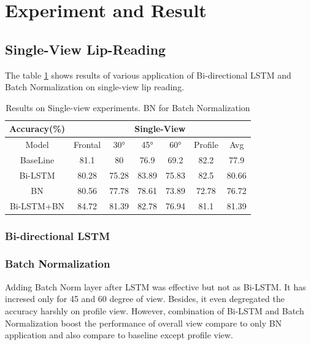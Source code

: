 
\section{Experiment and Result}

\subsection{Single-View Lip-Reading}
The table \ref{tab:singletb} shows results of various application of Bi-directional LSTM and Batch Normalization on single-view lip reading. 

\begin{table}[h]
\centering
    \begin{tabular}{c|cccccc}
        \multicolumn{1}{c|}{Accuracy(\%)} &%
        \multicolumn{6}{c}{Single-View}\\ \hline
        Model  &%
        Frontal & 30\si{\degree}& 45\si{\degree} & 60\si{\degree} & Profile & Avg\\\hline
        BaseLine%
        &%
        81.1& 80& 76.9& 69.2& 82.2&77.9\\
        Bi-LSTM%
        &%
        80.28& 75.28& 83.89& 75.83& 82.5&80.66\\
        BN%
        &%
        80.56& 77.78& 78.61& 73.89& 72.78&76.72\\
        Bi-LSTM+BN%
        &%
        84.72& 81.39& 82.78& 76.94& 81.1&81.39\\
    \end{tabular}
    \caption{Results on Single-view experiments. BN for Batch Normalization}
    \label{tab:singletb}
\end{table}

\subsubsection{Bi-directional LSTM}
\subsubsection{Batch Normalization}
Adding Batch Norm layer after LSTM was effective but not as Bi-LSTM. It	has incresed only for 45 and 60 degree of view. Besides, it even degregated the accuracy harshly on profile view. However, combination of Bi-LSTM and Batch Normalization boost the performance of overall view compare to only BN application and also compare to baseline except profile view. 	



